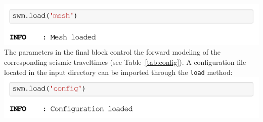 \documentclass[a4paper,fleqn]{cas-sc}
\begin{document}
\newline
\includegraphics[width=.5\textwidth]{./figures/load_mesh.pdf}
\newline
The parameters in the final block control the forward modeling of the corresponding seismic traveltimes (see Table~\ref{tab:config}).
A configuration file located in the input directory can be imported through the \texttt{load} method:
\newline
\includegraphics[width=.5\textwidth]{./figures/load_config.pdf}
\newline
\end{document}
